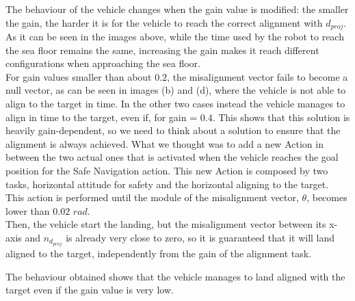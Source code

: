 \documentclass{article}
\begin{document}
\begin{figure}[H]
	\centering
	\hspace{10mm}
	\label{im:v_land_gain0_4}
\end{figure} 

\begin{figure}[H]
	\centering
	\hspace{10mm}
	\label{im:v_land_gain0_7}
\end{figure} 

The behaviour of the vehicle changes when the gain value is modified: the smaller the gain, the harder it is for the vehicle to reach the correct alignment with \(d_{proj}\). As it can be seen in the images above, while the time used by the robot to reach the sea floor remains the same, increasing the gain makes it reach different configurations when approaching the sea floor.\\
For gain values smaller than about \(0.2\), the misalignment vector fails to become a null vector, as can be seen in images (b) and (d), where the vehicle is not able to align to the target in time. In the other two cases instead the vehicle manages to align in time to the target, even if, for gain = \(0.4\).
This shows that this solution is heavily gain-dependent, so we need to think about a solution to ensure that the alignment is always achieved.
What we thought was to add a new Action in between the two actual ones that is activated when the vehicle reaches the goal position for the Safe Navigation action. This new Action is composed by two tasks, horizontal attitude for safety and the horizontal aligning to the target. This action is performed until the module of the misalignment vector, $\theta$, becomes lower than \(0.02 \) \({rad}\).\\
Then, the vehicle start the landing, but the misalignment vector between its x-axis and \(n_{d_{proj}}\) is already very close to zero, so it is guaranteed that it will land aligned to the target, independently from the gain of the alignment task.
\begin{figure}[H]
	\centering
	\label{im:v_land_gain0_1_ind}
\end{figure} 
The behaviour obtained shows that the vehicle manages to land aligned with the target even if the gain value is very low.
 
\end{document}
